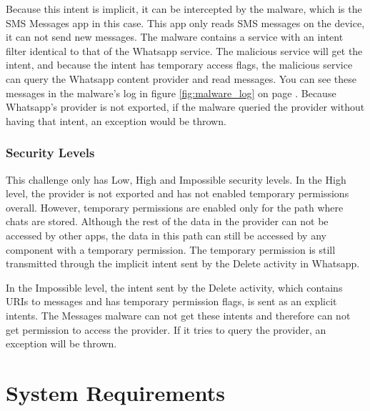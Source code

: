     Because this intent is implicit, it can be intercepted by the malware, which is the SMS Messages app in this case. This app only reads SMS messages on the device, it can not send new messages. The malware contains a service with an intent filter identical to that of the Whatsapp service. The malicious service will get the intent, and because the intent has temporary access flags, the malicious service can query the Whatsapp content provider and read messages. You can see these messages in the malware's log in figure \ref{fig:malware_log} on page \pageref{fig:malware_log}. Because Whatsapp's provider is not exported, if the malware queried the provider without having that intent, an exception would be thrown.
    
    \subsubsection{Security Levels}
        \label{subsubsec:provider_uri_hijack_security_levels}
        
    This challenge only has Low, High and Impossible security levels. In the High level, the provider is not exported and has not enabled temporary permissions overall. However, temporary permissions are enabled only for the path where chats are stored. Although the rest of the data in the provider can not be accessed by other apps, the data in this path can still be accessed by any component with a temporary permission. The temporary permission is still transmitted through the implicit intent sent by the Delete activity in Whatsapp.
    
    In the Impossible level, the intent sent by the Delete activity, which contains URIs to messages and has temporary permission flags, is sent as an explicit intents. The Messages malware can not get these intents and therefore can not get permission to access the provider. If it tries to query the provider, an exception will be thrown.
    
    \section{System Requirements}
        \label{sec:requirements}

